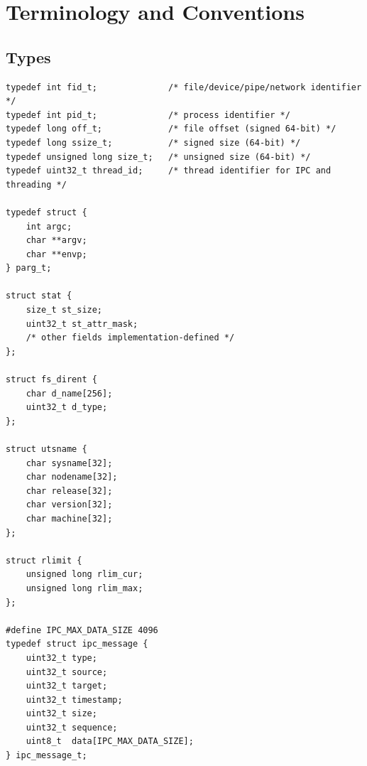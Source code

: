 \documentclass[12pt,a4paper]{article}
\begin{document}
\section{Terminology and Conventions}

\subsection{Types}
\begin{lstlisting}
typedef int fid_t;              /* file/device/pipe/network identifier */
typedef int pid_t;              /* process identifier */
typedef long off_t;             /* file offset (signed 64-bit) */
typedef long ssize_t;           /* signed size (64-bit) */
typedef unsigned long size_t;   /* unsigned size (64-bit) */
typedef uint32_t thread_id;     /* thread identifier for IPC and threading */

typedef struct {
    int argc;
    char **argv;
    char **envp;
} parg_t;

struct stat {
    size_t st_size;
    uint32_t st_attr_mask;
    /* other fields implementation-defined */
};

struct fs_dirent {
    char d_name[256];
    uint32_t d_type;
};

struct utsname {
    char sysname[32];
    char nodename[32];
    char release[32];
    char version[32];
    char machine[32];
};

struct rlimit {
    unsigned long rlim_cur;
    unsigned long rlim_max;
};

#define IPC_MAX_DATA_SIZE 4096
typedef struct ipc_message {
    uint32_t type;
    uint32_t source;
    uint32_t target;
    uint32_t timestamp;
    uint32_t size;
    uint32_t sequence;
    uint8_t  data[IPC_MAX_DATA_SIZE];
} ipc_message_t;
\end{lstlisting}
\end{document}
